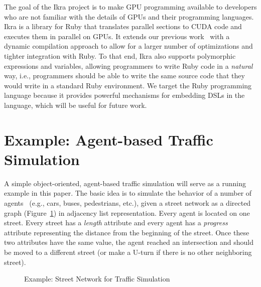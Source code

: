 \documentclass[preprint]{sigplanconf}
\begin{document}
The goal of the Ikra project is to make GPU programming available to developers who are not familiar with the details of GPUs and their programming languages. Ikra is a library for Ruby that translates parallel sections to CUDA code and executes them in parallel on GPUs. It extends our previous work~\cite{Masuhara:2012:DER:2237887.2237888} with a dynamic compilation approach to allow for a larger number of optimizations and tighter integration with Ruby. To that end, Ikra also supports polymorphic expressions and variables, allowing programmers to write Ruby code in a \emph{natural} way, i.e., programmers should be able to write the same source code that they would write in a standard Ruby environment. We target the Ruby programming language because it provides powerful mechanisms for embedding DSLs in the language, which will be useful for future work.

\section{Example: Agent-based Traffic Simulation}
A simple object-oriented, agent-based traffic simulation will serve as a running example in this paper. The basic idea is to simulate the behavior of a number of agents~\cite{Helbing2012} (e.g., cars, buses, pedestrians, etc.), given a street network as a directed graph (Figure~\ref{fig:running_example}) in adjacency list representation. Every agent is located on one street. Every street has a \emph{length} attribute and every agent has a \emph{progress} attribute representing the distance from the beginning of the street. Once these two attributes have the same value, the agent reached an intersection and should be moved to a different street (or make a U-turn if there is no other neighboring street).

\begin{figure}[!htp]
    \centering
    
    \caption{Example: Street Network for Traffic Simulation}
    \label{fig:running_example}%
\end{figure}
\end{document}

